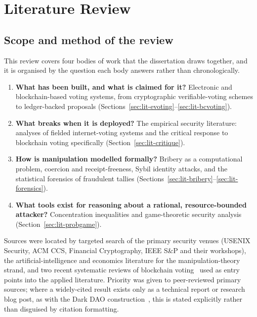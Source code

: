\section{Literature Review}
\label{sec:litreview}

\subsection{Scope and method of the review}

This review covers four bodies of work that the dissertation draws
together, and it is organised by the question each body answers rather
than chronologically.

\begin{enumerate}[leftmargin=1.6em,itemsep=2pt]
  \item \textbf{What has been built, and what is claimed for it?}
        Electronic and blockchain-based voting systems, from
        cryptographic verifiable-voting schemes to ledger-backed
        proposals (Sections~\ref{sec:lit-evoting}--\ref{sec:lit-bcvoting}).
  \item \textbf{What breaks when it is deployed?} The empirical
        security literature: analyses of fielded internet-voting systems
        and the critical response to blockchain voting specifically
        (Section~\ref{sec:lit-critique}).
  \item \textbf{How is manipulation modelled formally?} Bribery as a
        computational problem, coercion and receipt-freeness, Sybil
        identity attacks, and the statistical forensics of fraudulent
        tallies (Sections~\ref{sec:lit-bribery}--\ref{sec:lit-forensics}).
  \item \textbf{What tools exist for reasoning about a rational,
        resource-bounded attacker?} Concentration inequalities and
        game-theoretic security analysis
        (Section~\ref{sec:lit-probgame}).
\end{enumerate}

Sources were located by targeted search of the primary security venues
(USENIX Security, ACM CCS, Financial Cryptography, IEEE S\&P and their
workshops), the artificial-intelligence and economics literature for
the manipulation-theory strand, and two recent systematic reviews of
blockchain voting~\cite{ohize2025,rahul2025} used as entry points into
the applied literature. Priority was given to peer-reviewed primary
sources; where a widely-cited result exists only as a technical report
or research blog post, as with the Dark DAO
construction~\cite{daian2018}, this is stated explicitly rather than
disguised by citation formatting.

